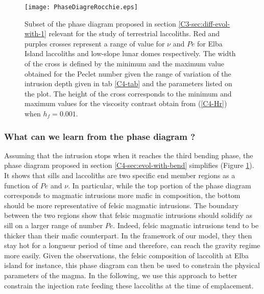 \begin{figure}[h!]
  \begin{center}
    \graphicspath{ {/Users/thorey/Documents/These/Projet/Refroidissement/Skin_Model/Figure/Figure_Heating/} }
    \texttt{[image: PhaseDiagreRocchie.eps]}
    \caption{Subset  of   the  phase   diagram  proposed   in  section
      \ref{C3-sec:diff-evol-with-1}   relevant   for  the   study   of
      terrestrial  laccoliths. Red  and  purples  crosses represent  a
      range of value for $\nu$ and $Pe$ for Elba Island laccoliths and
      low-slope lunar  domes respectively. The  width of the  cross is
      defined by  the minimum and  the maximum value obtained  for the
      Peclet  number given  the range  of variation  of the  intrusion
      depth given in tab \ref{C4-tab} and the parameters listed on the
      plot. The  height of  the cross corresponds  to the  minimum and
      maximum   values  for   the  viscosity   contrast  obtain   from
      (\ref{C4-Hr}) when $h_f=0.001$.}
    \label{C4-PhaseDiag}
  \end{center}
\end{figure}

\subsubsection*{What can we learn from the phase diagram ?}

Assuming that  the intrusion stops  when it reaches the  third bending
phase,     the      phase     diagram     proposed      in     section
\ref{C4-sec:evol-with-bend}  simplifies  (Figure  \ref{C4-PhaseDiag}).
It shows that sills and laccoliths are two specific end member regions
as a function of $Pe$ and  $\nu$. In particular, while the top portion
of the phase diagram corresponds  to magmatic intrusions more mafic in
composition,  the  bottom  should  be more  representative  of  felsic
magmatic intrusions.  The  boundary between the two  regions show that
felsic magmatic intrusions  should solidify as sill on  a larger range
of number $Pe$. Indeed, felsic  magmatic intrusions tend to be thicker
than their mafic counterpart. In the framework of our model, they then
stay hot  for a longueur period  of time and therefore,  can reach the
gravity  regime  more  easily.   Given the  observations,  the  felsic
composition  of laccolith  at  Elba island  for  instance, this  phase
diagram can then  be used to constrain the physical  parameters of the
magma. In the following, we use  this approach to better constrain the
injection rate feeding these laccoliths at the time of emplacement.

